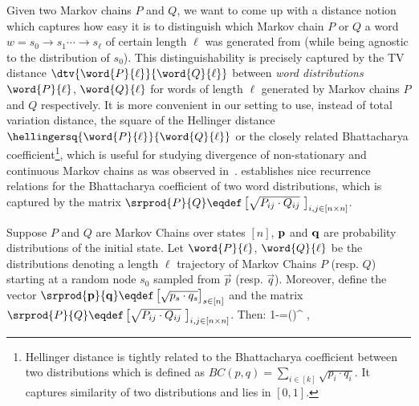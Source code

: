 Given two Markov chains $P$ and $Q$, we want to come up with a distance notion which captures how easy it is to distinguish which Markov chain $P$ or $Q$ a word $w=s_0\to s_1\cdots\to s_\ell$ of certain length $\ell$ was generated from (while being agnostic to the distribution of $s_0$). 
This distinguishability is precisely captured by the TV distance $\dtv{\word{P}{\ell}}{\word{Q}{\ell}}$ between {\em word distributions} 
$\word{P}{\ell}$, $\word{Q}{\ell}$ for words of length $\ell$ generated by Markov chains $P$ and $Q$ respectively. It is more convenient in our setting to use, instead of total variation distance, the square of the Hellinger distance $\hellingersq{\word{P}{\ell}}{\word{Q}{\ell}}$
or the closely related Bhattacharya coefficient\footnote{Hellinger distance is tightly related to the Bhattacharya coefficient between two distributions which is defined as
$BC(p,q) = \sum_{i \in [k]} \sqrt{p_i\cdot q_i}$. It captures similarity of two distributions and lies in $[0,1]$.}, which is useful for studying 
divergence of non-stationary and continuous Markov chains as was observed in~\cite{Kazakos78}. \cite{Kazakos78} establishes
nice recurrence relations for the Bhattacharya coefficient of two word distributions, which is captured by the matrix 
$\srprod{P}{Q}\eqdef\left[\sqrt{P_{ij}\cdot Q_{ij}}~ \right]_{i,j\in[n\times n]}$. %
\begin{lemma} \label{lemma:kazakos lemma}
Suppose $P$ and $Q$ are Markov Chains over states $[n]$, $\mathbf{p}$ and $\mathbf{q}$ are probability distributions of the initial state. Let $\word{P}{\ell}$, $\word{Q}{\ell}$ 
be the distributions denoting a length $\ell$ trajectory of Markov Chains $P$ (resp. $Q$) starting at a random node $s_0$ sampled from $\vec{p}$ (resp. $\vec{q}$). Moreover, define 
the vector $\srprod{\vect{p}}{\vect{q}}\eqdef\left[\sqrt{p_s\cdot q_s}\right]_{s\in[n]}$ and the matrix $\srprod{P}{Q}\eqdef\left[\sqrt{P_{ij}\cdot Q_{ij}}~ \right]_{i,j\in[n\times n]}$. Then:
\be
\label{eq:hellinger_square_algebraic}
1-=\circ \left(\right)^{\ell} \circ \onev,
\ee
\end{lemma}

